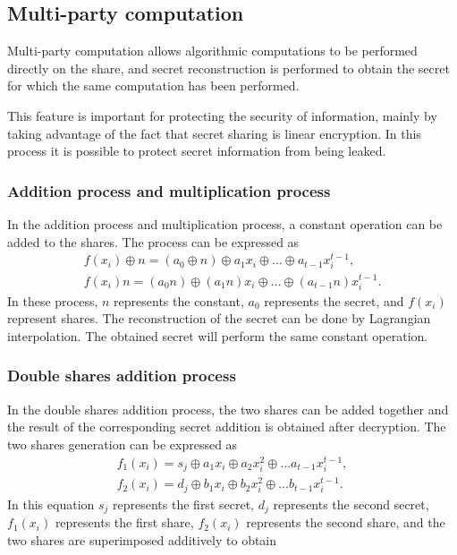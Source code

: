 \subsection{Multi-party computation}\label{(2,2)-VC}

Multi-party computation allows algorithmic computations to be performed directly on the share, and secret reconstruction is performed to obtain the secret for which the same computation has been performed.

This feature is important for protecting the security of information, mainly by taking advantage of the fact {\color{red}that secret sharing is linear encryption.} In this process it is possible to protect secret information from being leaked.

\subsubsection{Addition process and multiplication process}\label{subsec_NC-BPDVC_framework}

In the addition process and multiplication process, a constant operation can be added to the shares. The process can be expressed as
\begin{equation}
\begin{array}{l}
f\left(x_{i}\right) \oplus n=\left(a_{0} \oplus n\right) \oplus a_{1} x_{i} \oplus \ldots \oplus a_{t-1} x_{i}^{t-1},\\
f\left(x_{i}\right) n=\left(a_{0} n\right) \oplus\left(a_{1} n\right) x_{i} \oplus \ldots \oplus \left(a_{t-1} n\right) x_{i}^{t-1}.
\end{array}
\end{equation}In these process, $n$ represents the constant, ${a}_{0}$ represents the secret, and $f\left(x_{i}\right)$ represent shares. The reconstruction of the secret can be done by Lagrangian interpolation. The obtained secret will perform the same constant operation.

\subsubsection{Double shares addition process}	

In the double shares addition process, the two shares can be added together and the result of the corresponding secret addition is obtained after decryption. The two shares generation can be expressed as
\begin{equation}
\begin{array}{l}
f_{1}\left(x_{i}\right)=s_{j} \oplus a_{1} x_{i} \oplus a_{2} x_{i}^{2} \oplus \ldots a_{t-1} x_{i}^{t-1}, \\
f_{2}\left(x_{i}\right)=d_{j} \oplus b_{1} x_{i} \oplus b_{2} x_{i}^{2} \oplus \ldots b_{t-1} x_{i}^{t-1}.
\end{array}
\end{equation}In this equation ${s}_{j}$ represents the first secret, ${d}_{j}$ represents the second secret, $f_{1}\left(x_{i}\right)$ represents the first share, $f_{2}\left(x_{i}\right)$ represents the second share, and the two shares are superimposed additively to obtain

